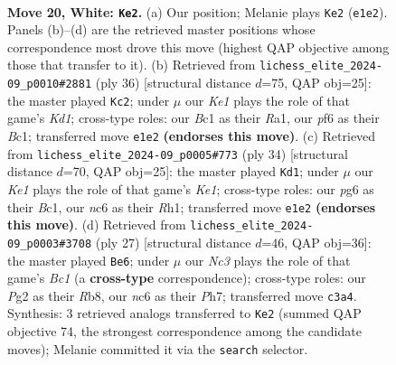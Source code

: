 \documentclass[11pt]{article}
\begin{document}
\clearpage

\begin{figure}[p]\centering
\begin{subfigure}{0.46\textwidth}\centering
\resizebox{\linewidth}{!}{%
\newchessgame
\chessboard[
  setfen={r4r1b/1ppb1k2/p1n2pp1/4p2p/2P1P3/2N2N2/PPB2PP1/R1B1K1R1 w - - 2 20},
  showmover=false,
  pgfstyle=straightmove, color=movearrow, markmove={e1-e2}
]}
\caption{}
\end{subfigure}\hfill
\begin{subfigure}{0.46\textwidth}\centering
\resizebox{\linewidth}{!}{%
\newchessgame
\chessboard[
  setfen={r4rk1/p3bpp1/1p2pn1p/3p3P/P2P4/2PN4/1P3PP1/R1BK3R w - - 0 19},
  showmover=false,
  pgfstyle=straightmove, color=movearrow, markmove={d1-c2}
]}
\caption{}
\end{subfigure}
\\[4pt]
\begin{subfigure}{0.46\textwidth}\centering
\resizebox{\linewidth}{!}{%
\newchessgame
\chessboard[
  setfen={r6r/pp2kpp1/3bpn1p/3p3P/P2P4/2PN4/1P3PP1/R1B1K2R w KQ - 1 18},
  showmover=false,
  pgfstyle=straightmove, color=movearrow, markmove={e1-d1}
]}
\caption{}
\end{subfigure}\hfill
\begin{subfigure}{0.46\textwidth}\centering
\resizebox{\linewidth}{!}{%
\newchessgame
\chessboard[
  setfen={1rb1k2r/pp3ppp/2n2n2/1N2p3/4P3/1N3P2/PP1R1KPP/5B1R b k - 0 14},
  showmover=false,
  pgfstyle=straightmove, color=movearrow, markmove={c8-e6}
]}
\caption{}
\end{subfigure}
\caption{\textbf{Move 20, White: \texttt{Ke2}.} (a) Our position; Melanie plays \texttt{Ke2} (\texttt{e1e2}). Panels (b)--(d) are the retrieved master positions whose correspondence most drove this move (highest QAP objective among those that transfer to it). (b) Retrieved from \texttt{lichess\_elite\_2024-09\_p0010\#2881} (ply 36) [structural distance $d$=75, QAP obj=25]: the master played \texttt{Kc2}; under $\mu$ our \emph{Ke1} plays the role of that game's \emph{Kd1}; cross-type roles: our \emph{B}c1 as their \emph{R}a1, our \emph{p}f6 as their \emph{B}c1; transferred move \texttt{e1e2} \textbf{(endorses this move)}. (c) Retrieved from \texttt{lichess\_elite\_2024-09\_p0005\#773} (ply 34) [structural distance $d$=70, QAP obj=25]: the master played \texttt{Kd1}; under $\mu$ our \emph{Ke1} plays the role of that game's \emph{Ke1}; cross-type roles: our \emph{p}g6 as their \emph{B}c1, our \emph{n}c6 as their \emph{R}h1; transferred move \texttt{e1e2} \textbf{(endorses this move)}. (d) Retrieved from \texttt{lichess\_elite\_2024-09\_p0003\#3708} (ply 27) [structural distance $d$=46, QAP obj=36]: the master played \texttt{Be6}; under $\mu$ our \emph{Nc3} plays the role of that game's \emph{Bc1} (a \textbf{cross-type} correspondence); cross-type roles: our \emph{P}g2 as their \emph{R}b8, our \emph{n}c6 as their \emph{P}h7; transferred move \texttt{c3a4}. Synthesis: 3 retrieved analogs transferred to \texttt{Ke2} (summed QAP objective 74, the strongest correspondence among the candidate moves); Melanie committed it via the \texttt{search} selector.}
\label{fig:thought-m38}
\end{figure}
\end{document}
